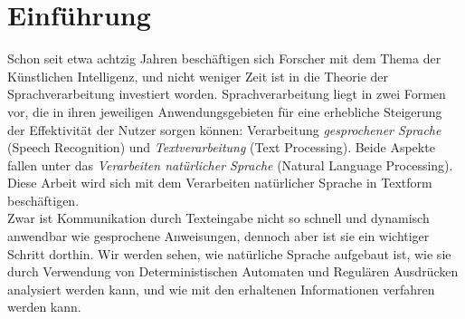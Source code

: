 \documentclass[12pt,twoside]{article}
\theoremstyle{plain}
\theoremstyle{definition}
\theoremstyle{remark}
\begin{document}

\section{Einführung}
\label{sec:intro}
	Schon seit etwa achtzig Jahren beschäftigen sich Forscher mit dem Thema der Künstlichen Intelligenz, und nicht weniger Zeit ist in die Theorie der Sprachverarbeitung investiert worden.
	Sprachverarbeitung liegt in zwei Formen vor, die in ihren jeweiligen Anwendungsgebieten für eine erhebliche Steigerung der Effektivität der Nutzer sorgen können: Verarbeitung \textit{gesprochener Sprache} (Speech Recognition) und \textit{Textverarbeitung} (Text Processing).
	Beide Aspekte fallen unter das \textit{Verarbeiten natürlicher Sprache} (Natural Language Processing).
	Diese Arbeit wird sich mit dem Verarbeiten natürlicher Sprache in Textform beschäftigen.\\
	Zwar ist Kommunikation durch Texteingabe nicht so schnell und dynamisch anwendbar wie gesprochene Anweisungen, dennoch aber ist sie ein wichtiger Schritt dorthin.
	Wir werden sehen, wie natürliche Sprache aufgebaut ist, wie sie durch Verwendung von Deterministischen Automaten und Regulären Ausdrücken analysiert werden kann, und wie mit den erhaltenen Informationen verfahren werden kann.
\end{document}
